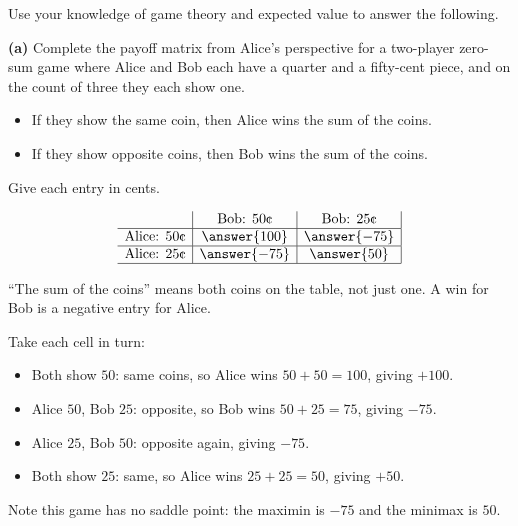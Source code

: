 \documentclass[12pt]{ximera}
\begin{document}
\begin{problem}
Use your knowledge of game theory and expected value to answer the following.

\begin{prompt}
\textbf{(a)} Complete the payoff matrix from Alice's perspective for a two-player
zero-sum game where Alice and Bob each have a quarter and a fifty-cent piece, and on
the count of three they each show one.
\begin{itemize}
\item If they show the same coin, then Alice wins the sum of the coins.
\item If they show opposite coins, then Bob wins the sum of the coins.
\end{itemize}

Give each entry in cents.

\[
\begin{array}{c|c|c|}
\phantom{|} & \text{Bob: }50\text{\textcent} & \text{Bob: }25\text{\textcent} \\\hline
\text{Alice: }50\text{\textcent} & \answer{100} & \answer{-75} \\\hline
\text{Alice: }25\text{\textcent} & \answer{-75} & \answer{50} \\\hline
\end{array}
\]

\begin{hint}
``The sum of the coins'' means both coins on the table, not just one. A win for Bob
is a negative entry for Alice.
\end{hint}

\begin{solution}
Take each cell in turn:
\begin{itemize}
\item Both show $50$\textcent: same coins, so Alice wins $50+50=100$\textcent, giving $+100$.
\item Alice $50$\textcent, Bob $25$\textcent: opposite, so Bob wins $50+25=75$\textcent, giving $-75$.
\item Alice $25$\textcent, Bob $50$\textcent: opposite again, giving $-75$.
\item Both show $25$\textcent: same, so Alice wins $25+25=50$\textcent, giving $+50$.
\end{itemize}

Note this game has no saddle point: the maximin is $-75$ and the minimax is $50$.
\end{solution}
\end{prompt}


\end{problem}
\end{document}
